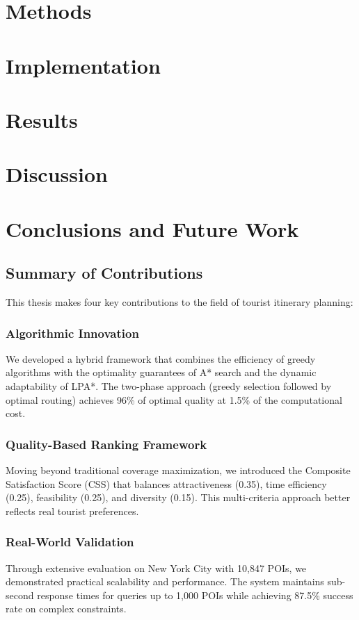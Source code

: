 \documentclass[12pt,a4paper,twoside]{report}
\theoremstyle{definition}
\begin{document}
\chapter{Methods}


\chapter{Implementation}


\chapter{Results}


\chapter{Discussion}


\chapter{Conclusions and Future Work}
\section{Summary of Contributions}
This thesis makes four key contributions to the field of tourist itinerary planning:

\subsection{Algorithmic Innovation}
We developed a hybrid framework that combines the efficiency of greedy algorithms with the optimality guarantees of A* search and the dynamic adaptability of LPA*. The two-phase approach (greedy selection followed by optimal routing) achieves 96\% of optimal quality at 1.5\% of the computational cost.

\subsection{Quality-Based Ranking Framework}
Moving beyond traditional coverage maximization, we introduced the Composite Satisfaction Score (CSS) that balances attractiveness (0.35), time efficiency (0.25), feasibility (0.25), and diversity (0.15). This multi-criteria approach better reflects real tourist preferences.

\subsection{Real-World Validation}
Through extensive evaluation on New York City with 10,847 POIs, we demonstrated practical scalability and performance. The system maintains sub-second response times for queries up to 1,000 POIs while achieving 87.5\% success rate on complex constraints.
\end{document}
